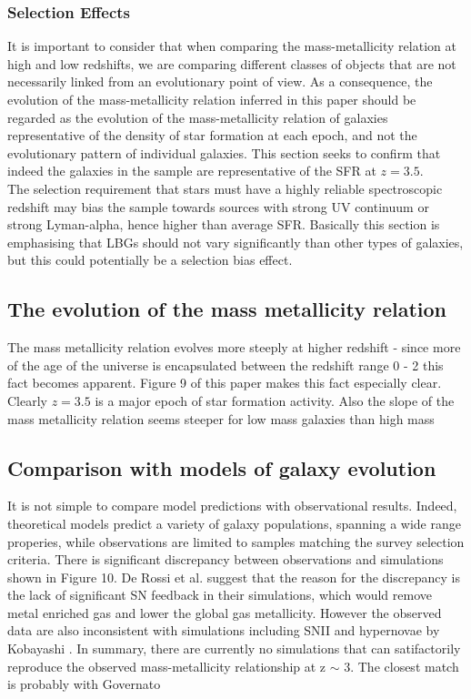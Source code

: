 \documentclass{literature}
\begin{document}
\subsubsection{Selection Effects}
It is important to consider that when comparing the mass-metallicity relation at high and low redshifts, we are comparing different classes of objects that are not necessarily linked from an evolutionary point of view. As a consequence, the evolution of the mass-metallicity relation inferred in this paper should be regarded as the evolution of the mass-metallicity relation of galaxies representative of the density of star formation at each epoch, and not the evolutionary pattern of individual galaxies. This section seeks to confirm that indeed the galaxies in the sample are representative of the SFR at $z = 3.5$. \\
The selection requirement that stars must have a highly reliable spectroscopic redshift may bias the sample towards sources with strong UV continuum or strong Lyman-alpha, hence higher than average SFR. Basically this section is emphasising that LBGs should not vary significantly than other types of galaxies, but this could potentially be a selection bias effect.
\subsection{The evolution of the mass metallicity relation}
The mass metallicity relation evolves more steeply at higher redshift - since more of the age of the universe is encapsulated between the redshift range 0 - 2 this fact becomes apparent. Figure 9 of this paper makes this fact especially clear. Clearly $z = 3.5$ is a major epoch of star formation activity. Also the slope of the mass metallicity relation seems steeper for low mass galaxies than high mass
\subsection{Comparison with models of galaxy evolution}
It is not simple to compare model predictions with observational results. Indeed, theoretical models predict a variety of galaxy populations, spanning a wide range properies, while observations are limited to samples matching the survey selection criteria. There is significant discrepancy between observations and simulations shown in Figure 10. De Rossi et al. \citep{deRossi_2007} suggest that the reason for the discrepancy is the lack of significant SN feedback in their simulations, which would remove metal enriched gas and lower the global gas metallicity. However the observed data \citep{Leitherer1999} are also inconsistent with simulations including SNII and hypernovae by Kobayashi \citep{Kobayashi2007}. In summary, there are currently no simulations that can satifactorily reproduce the observed mass-metallicity relationship at z $\sim$ 3. The closest match is probably with Governato 
\end{document}
